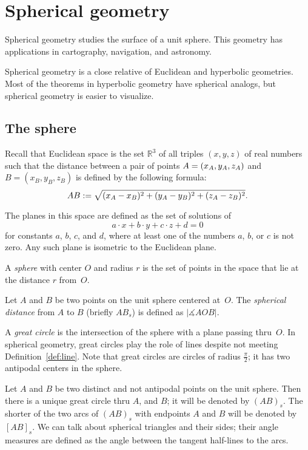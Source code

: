 \chapter{Spherical geometry}
\label{chap:sphere}

Spherical geometry studies the surface of a unit sphere.
This geometry has applications in cartography, navigation, and astronomy.

Spherical geometry is a close relative of Euclidean and hyperbolic geometries.
Most of the theorems in hyperbolic geometry have spherical analogs,
but spherical geometry is easier to visualize. 

\section{The sphere}

Recall that Euclidean space is the set $\mathbb{R}^3$ of all triples $(x,y,z)$ of real numbers
such that the distance between a pair of points
$A=(x_A,y_A,z_A)$ and $B=(x_B,y_B,z_B)$
is defined by the following formula:
$$AB
:=
\sqrt{(x_A-x_B)^2+(y_A-y_B)^2+(z_A-z_B)^2}.$$

The planes in this space are defined as the set of solutions of 
$$a\cdot x+b\cdot y+c\cdot z+d=0$$ 
for constants $a$, $b$, $c$, and $d$, where at least one of the numbers $a$, $b$, or $c$ is not zero.
Any such plane is isometric to the Euclidean plane.

A \emph{sphere} with center $O$ and radius $r$ is the set of points in the space that lie at the distance $r$ from~$O$.

Let $A$ and $B$ be two points on the unit sphere centered at~$O$.
The \emph{spherical distance} from $A$ to $B$
(briefly $AB_s$)
 is defined as  $|\measuredangle AOB|$. 

A \emph{great circle} is the intersection of the sphere with a plane passing thru~$O$.
In spherical geometry, great circles play the role of lines despite not meeting Definition~\ref{def:line}.
Note that great circles are circles of radius $\tfrac\pi2$;
it has two antipodal centers in the sphere.

Let $A$ and $B$ be two distinct and not antipodal points on the unit sphere.
Then there is a unique great circle thru $A$, and $B$;
it will be denoted by $(AB)_s$.
The shorter of the two arcs of $(AB)_s$ with endpoints $A$ and $B$ will be denoted by $[AB]_s$.
We can talk about spherical triangles and their sides;
their angle measures are defined as the angle between the tangent half-lines to the arcs.

